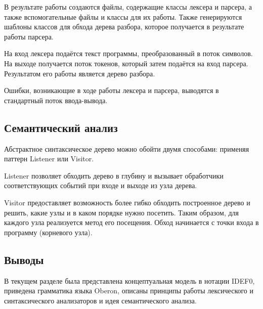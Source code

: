 В результате работы создаются файлы, содержащие классы лексера и парсера, а также вспомогательные файлы и классы для их работы. Также генерируются шаблоны классов для обхода дерева разбора, которое получается в результате работы парсера.

На вход лексера подаётся текст программы, преобразованный в поток символов. На выходе получается поток токенов, который затем подаётся на вход парсера. Результатом его работы является дерево разбора.

Ошибки, возникающие в ходе работы лексера и парсера, выводятся в стандартный поток ввода-вывода. \\

\subsection{Семантический анализ}
Абстрактное синтаксическое дерево можно обойти двумя способами: применяя паттерн Listener или Visitor. 

Listener позволяет обходить дерево в глубину и вызывает обработчики соответствующих событий при входе и выходе из узла дерева. 

Visitor предоставляет возможность более гибко обходить построенное дерево и решить, какие узлы и в каком порядке нужно посетить. Таким образом, для каждого узла реализуется метод его посещения. Обход начинается с точки входа в программу (корневого узла). \\

\subsection*{Выводы}
В текущем разделе была представлена концептуальная модель в нотации IDEF0, приведена грамматика языка Oberon, описаны принципы работы лексического и синтаксического анализаторов и идея семантического анализа.
